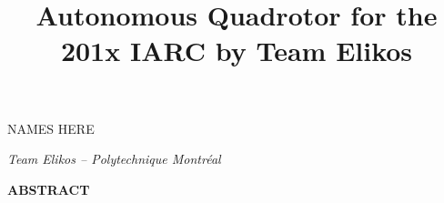 \documentclass[12pt,letterpaper]{article}
\title{Autonomous Quadrotor for the 201x IARC by Team Elikos}
\newenvironment{nscenter}
{\parskip=0pt\par\nopagebreak\centering}
{\par\noindent\ignorespacesafterend}
\newcommand{\affiliatedauthors}[1]{
	\begin{nscenter}
		#1
	\end{nscenter}
}
\newcommand{\affiliateduniversity}[1]{
	\begin{nscenter}
		\textit{#1}
	\end{nscenter}
}
\renewcommand{\abstractname}{ABSTRACT}
\renewenvironment{abstract}
{\vspace{-0.5ex}
	\small
	\begin{center}
		\bfseries \abstractname\vspace{-4ex}\vspace{0pt}
	\end{center}
	\list{}{
		\setlength{\leftmargin}{0.5in}
		\setlength{\rightmargin}{\leftmargin}
	}
	\item\relax}
{\endlist}
\begin{document}
	
	\begin{center}
		\textbf{\LARGE{\thetitle}}
	\end{center}
	
	\affiliatedauthors{NAMES HERE}
	\affiliateduniversity{Team Elikos -- Polytechnique Montréal}
	
	
	\begin{abstract}
		
	\end{abstract}
	
	
	
	
	
	
	
	
	
	
	
	
	
	\printbibliography
	
\end{document}
